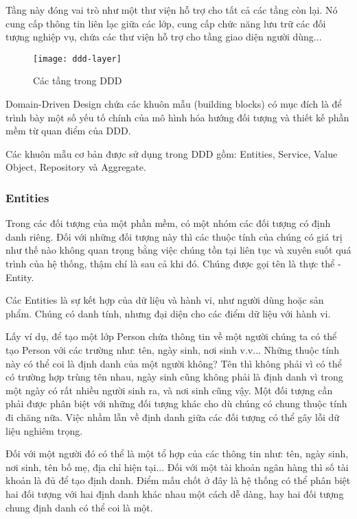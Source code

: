 Tầng này đóng vai trò như một thư viện hỗ trợ cho tất cả các tầng còn lại. Nó cung cấp thông tin liên lạc giữa các lớp, cung cấp chức năng lưu trữ các đối tượng nghiệp vụ, chứa các thư viện hỗ trợ cho tầng giao diện người dùng...

\begin{figure}[H]
	\centering
	\texttt{[image: ddd-layer]}
	\caption{Các tầng trong DDD}
\end{figure}

Domain-Driven Design chứa các khuôn mẫu (building blocks) có mục đích là để trình bày một số yếu tố chính của mô hình hóa hướng đối tượng và thiết kế phần mềm từ quan điểm của DDD.

Các khuôn mẫu cơ bản được sử dụng trong DDD gồm: Entities, Service, Value Object, Repository và Aggregate.

\subsubsection{Entities}

Trong các đối tượng của một phần mềm, có một nhóm các đối tượng có định danh riêng. Đối với những đối tượng này thì các thuộc tính của chúng có giá trị như thế nào không quan trọng bằng việc chúng tồn tại liên tục và xuyên suốt quá trình của hệ thống, thậm chí là sau cả khi đó. Chúng được gọi tên là thực thể - Entity.

Các Entities là sự kết hợp của dữ liệu và hành vi, như người dùng hoặc sản phẩm. Chúng có danh tính, nhưng đại diện cho các điểm dữ liệu với hành vi.

Lấy ví dụ, để tạo một lớp Person chứa thông tin về một người chúng ta có thể tạo Person với các trường như: tên, ngày sinh, nơi sinh v.v... Những thuộc tính này có thể coi là định danh của một người không? Tên thì không phải vì có thể có trường hợp trùng tên nhau, ngày sinh cũng không phải là định danh vì trong một ngày có rất nhiều người sinh ra, và nơi sinh cũng vậy. Một đối tượng cần phải được phân biệt với những đối tượng khác cho dù chúng có chung thuộc tính đi chăng nữa. Việc nhầm lẫn về định danh giữa các đối tượng có thể gây lỗi dữ liệu nghiêm trọng.

Đối với một người đó có thể là một tổ hợp của các thông tin như: tên, ngày sinh, nơi sinh, tên bố mẹ, địa chỉ hiện tại... Đối với một tài khoản ngân hàng thì số tài khoản là đủ để tạo định danh. Điểm mấu chốt ở đây là hệ thống có thể phân biệt hai đối tượng với hai định danh khác nhau một cách dễ dàng, hay hai đối tượng chung định danh có thể coi là một.

